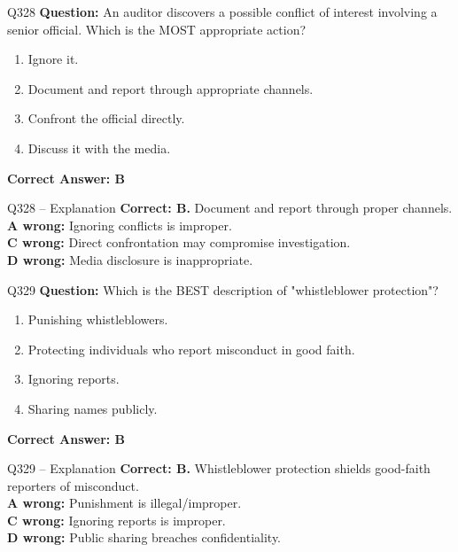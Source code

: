\documentclass[aspectratio=169,10pt]{beamer}
\begin{document}
	\begin{frame}[t]{Q328}
		\small
		\textbf{Question:} An auditor discovers a possible conflict of interest involving a senior official. Which is the MOST appropriate action?
		\begin{enumerate}[label=\Alph*.,itemsep=1pt,topsep=2pt]
			\item Ignore it.
			\item Document and report through appropriate channels.
			\item Confront the official directly.
			\item Discuss it with the media.
		\end{enumerate}
		\vspace{4pt}
		\textbf{Correct Answer: B}
	\end{frame}
	
	\begin{frame}[t]{Q328 -- Explanation}
		\small
		\textbf{Correct: B.} Document and report through proper channels. \\[4pt]
		\textbf{A wrong:} Ignoring conflicts is improper. \\[2pt]
		\textbf{C wrong:} Direct confrontation may compromise investigation. \\[2pt]
		\textbf{D wrong:} Media disclosure is inappropriate.
	\end{frame}
	
	\begin{frame}[t]{Q329}
		\small
		\textbf{Question:} Which is the BEST description of "whistleblower protection"?
		\begin{enumerate}[label=\Alph*.,itemsep=1pt,topsep=2pt]
			\item Punishing whistleblowers.
			\item Protecting individuals who report misconduct in good faith.
			\item Ignoring reports.
			\item Sharing names publicly.
		\end{enumerate}
		\vspace{4pt}
		\textbf{Correct Answer: B}
	\end{frame}
	
	\begin{frame}[t]{Q329 -- Explanation}
		\small
		\textbf{Correct: B.} Whistleblower protection shields good-faith reporters of misconduct. \\[4pt]
		\textbf{A wrong:} Punishment is illegal/improper. \\[2pt]
		\textbf{C wrong:} Ignoring reports is improper. \\[2pt]
		\textbf{D wrong:} Public sharing breaches confidentiality.
	\end{frame}
	
\end{document}
